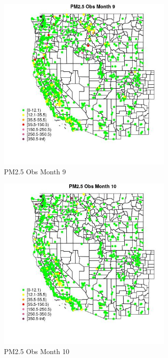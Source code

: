 \begin{figure} 
\centering  
\includegraphics[width=0.77\textwidth]{Code_Outputs/Report_ML_input_PM25_Step4_part_f_de_duplicated_aves_prioritize_24hr_obswNAs_MapObsMo9PM25_Obs.jpg} 
\caption{\label{fig:Report_ML_input_PM25_Step4_part_f_de_duplicated_aves_prioritize_24hr_obswNAsMapObsMo9PM25_Obs}PM2.5 Obs Month 9} 
\end{figure} 
 

\clearpage 

\begin{figure} 
\centering  
\includegraphics[width=0.77\textwidth]{Code_Outputs/Report_ML_input_PM25_Step4_part_f_de_duplicated_aves_prioritize_24hr_obswNAs_MapObsMo10PM25_Obs.jpg} 
\caption{\label{fig:Report_ML_input_PM25_Step4_part_f_de_duplicated_aves_prioritize_24hr_obswNAsMapObsMo10PM25_Obs}PM2.5 Obs Month 10} 
\end{figure} 
 

